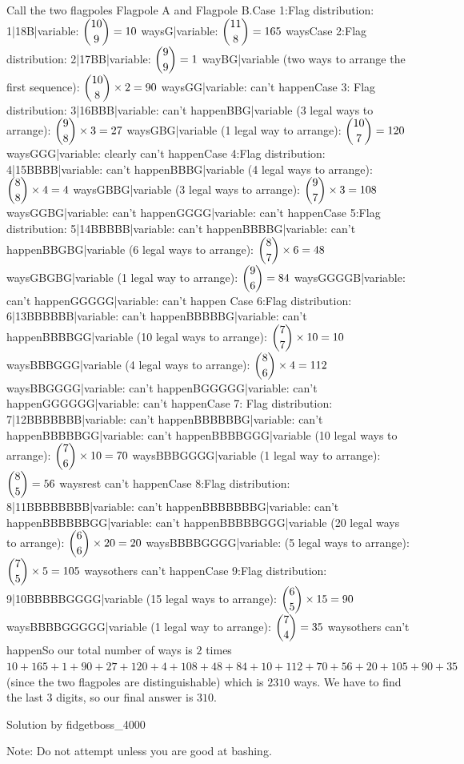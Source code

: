 \begin{enumerate}
Call the two flagpoles Flagpole A and Flagpole B.Case 1:Flag distribution: 1|18B|variable: $\dbinom{10}{9}=10$ waysG|variable: $\dbinom{11}{8}=165$ waysCase 2:Flag distribution: 2|17BB|variable: $\dbinom{9}{9}=1$ wayBG|variable (two ways to arrange the first sequence): $\dbinom{10}{8} \times 2 = 90$ waysGG|variable: can't happenCase 3: Flag distribution: 3|16BBB|variable: can't happenBBG|variable (3 legal ways to arrange): $\dbinom{9}{8} \times 3 = 27$ waysGBG|variable (1 legal way to arrange): $\dbinom{10}{7} = 120$ waysGGG|variable: clearly can't happenCase 4:Flag distribution: 4|15BBBB|variable: can't happenBBBG|variable (4 legal ways to arrange): $\dbinom{8}{8} \times 4 = 4$ waysGBBG|variable (3 legal ways to arrange): $\dbinom{9}{7} \times 3 = 108$ waysGGBG|variable: can't happenGGGG|variable: can't happenCase 5:Flag distribution: 5|14BBBBB|variable: can't happenBBBBG|variable: can't happenBBGBG|variable (6 legal ways to arrange): $\dbinom{8}{7} \times 6 = 48$ waysGBGBG|variable (1 legal way to arrange): $\dbinom{9}{6} = 84$ waysGGGGB|variable: can't happenGGGGG|variable: can't happen Case 6:Flag distribution: 6|13BBBBBB|variable: can't happenBBBBBG|variable: can't happenBBBBGG|variable (10 legal ways to arrange): $\dbinom{7}{7} \times 10 = 10$ waysBBBGGG|variable (4 legal ways to arrange): $\dbinom{8}{6} \times 4 = 112$ waysBBGGGG|variable: can't happenBGGGGG|variable: can't happenGGGGGG|variable: can't happenCase 7: Flag distribution: 7|12BBBBBBB|variable: can't happenBBBBBBG|variable: can't happenBBBBBGG|variable: can't happenBBBBGGG|variable (10 legal ways to arrange): $\dbinom{7}{6} \times 10 = 70$ waysBBBGGGG|variable (1 legal way to arrange): $\dbinom{8}{5} = 56$ waysrest can't happenCase 8:Flag distribution: 8|11BBBBBBBB|variable: can't happenBBBBBBBG|variable: can't happenBBBBBBGG|variable: can't happenBBBBBGGG|variable (20 legal ways to arrange): $\dbinom{6}{6} \times 20 = 20$ waysBBBBGGGG|variable: (5 legal ways to arrange): $\dbinom{7}{5} \times 5 = 105$ waysothers can't happenCase 9:Flag distribution: 9|10BBBBBGGGG|variable (15 legal ways to arrange): $\dbinom{6}{5} \times 15 = 90$ waysBBBBGGGGG|variable (1 legal way to arrange): $\dbinom{7}{4} = 35$ waysothers can't happenSo our total number of ways is $2$ times $10+165+1+90+27+120+4+108+48+84+10+112+70+56+20+105+90+35$ (since the two flagpoles are distinguishable) which is $2310$ ways. We have to find the last 3 digits, so our final answer is $310$.

 Solution by fidgetboss\_4000

 Note: Do not attempt unless you are good at bashing.


\end{enumerate}
